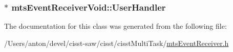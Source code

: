 \subsubsection[{User\+Handler}]{$\ast$ mts\+Event\+Receiver\+Void\+::\+User\+Handler\hspace{0.3cm}{\ttfamily [protected]}}\label{classmts_event_receiver_void_a475c1ce714e9bbd2e708691fbc74c871}


The documentation for this class was generated from the following file\+:\begin{DoxyCompactItemize}
\item 
/\+Users/anton/devel/cisst-\/saw/cisst/cisst\+Multi\+Task/\hyperlink{mts_event_receiver_8h}{mts\+Event\+Receiver.\+h}\end{DoxyCompactItemize}
